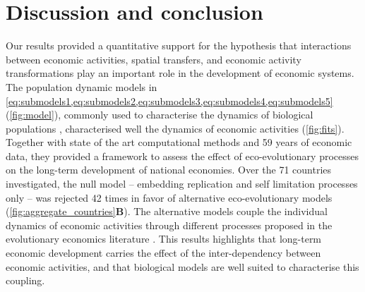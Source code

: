 \section{Discussion and conclusion}

Our results provided a quantitative support for the hypothesis that interactions between economic activities, spatial transfers, and economic activity transformations play an important role in the development of economic systems. 
% 
The population dynamic models in \cref{eq:submodels1,eq:submodels2,eq:submodels3,eq:submodels4,eq:submodels5} (\cref{fig:model}), commonly used to characterise the dynamics of biological populations \citep{Bunin2017,Scheffer2006a,Case1990,Tilman1994b,eigen1988molecular}, characterised well the dynamics of economic activities (\cref{fig:fits}). Together with state of the art computational methods and 59 years of economic data, they provided a framework to assess the effect of eco-evolutionary processes on the long-term development of national economies.
% 
Over the 71 countries investigated, the null model -- embedding replication and self limitation processes only -- was rejected 42 times in favor of alternative eco-evolutionary models (\cref{fig:aggregate_countries}\textbf{B}). The alternative models couple the individual dynamics of economic activities through different processes proposed in the evolutionary economics literature \citep{Hodgson2019}. This results highlights that long-term economic development carries the effect of the inter-dependency between economic activities, and that biological models are well suited to characterise this coupling. %

